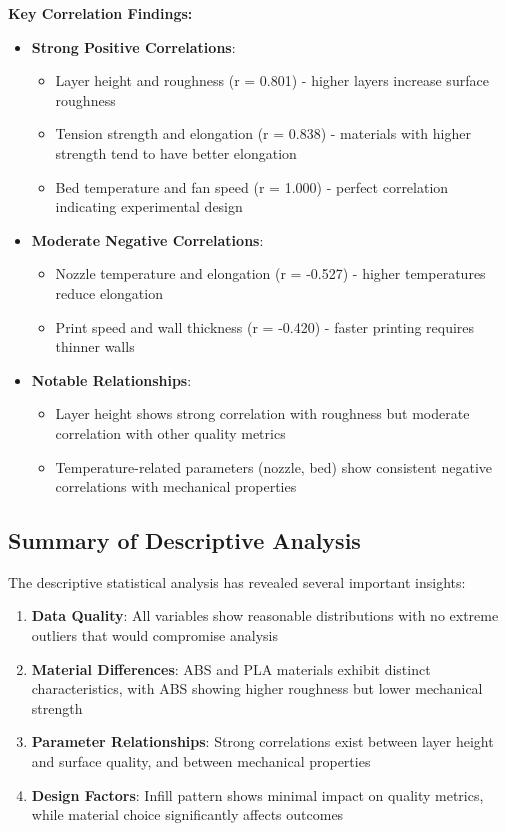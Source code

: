 \textbf{Key Correlation Findings:}
\begin{itemize}
    \item \textbf{Strong Positive Correlations}:
    \begin{itemize}
        \item Layer height and roughness (r = 0.801) - higher layers increase surface roughness
        \item Tension strength and elongation (r = 0.838) - materials with higher strength tend to have better elongation
        \item Bed temperature and fan speed (r = 1.000) - perfect correlation indicating experimental design
    \end{itemize}
    \item \textbf{Moderate Negative Correlations}:
    \begin{itemize}
        \item Nozzle temperature and elongation (r = -0.527) - higher temperatures reduce elongation
        \item Print speed and wall thickness (r = -0.420) - faster printing requires thinner walls
    \end{itemize}
    \item \textbf{Notable Relationships}:
    \begin{itemize}
        \item Layer height shows strong correlation with roughness but moderate correlation with other quality metrics
        \item Temperature-related parameters (nozzle, bed) show consistent negative correlations with mechanical properties
    \end{itemize}
\end{itemize}

\subsection{Summary of Descriptive Analysis}

The descriptive statistical analysis has revealed several important insights:

\begin{enumerate}
    \item \textbf{Data Quality}: All variables show reasonable distributions with no extreme outliers that would compromise analysis
    \item \textbf{Material Differences}: ABS and PLA materials exhibit distinct characteristics, with ABS showing higher roughness but lower mechanical strength
    \item \textbf{Parameter Relationships}: Strong correlations exist between layer height and surface quality, and between mechanical properties
    \item \textbf{Design Factors}: Infill pattern shows minimal impact on quality metrics, while material choice significantly affects outcomes
\end{enumerate}

